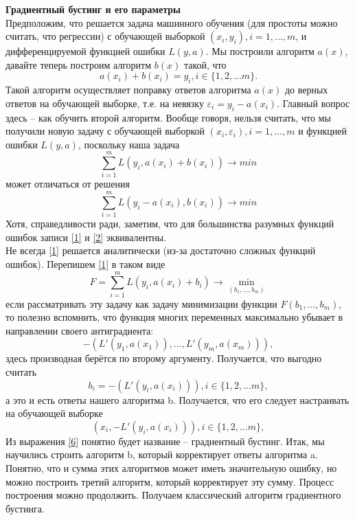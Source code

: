 \textbf{Градиентный бустинг и его параметры} \\
Предположим, что решается задача машинного обучения (для простоты можно считать, что регрессии) с обучающей выборкой $(x_i, y_i), i=1,...,m$, и дифференцируемой функцией ошибки $L(y, a)$. Мы построили алгоритм $a(x)$, давайте теперь построим алгоритм $b(x)$ такой, что
\begin{equation}\label{sum a and b}
    a(x_i)+b(x_i)=y_i, i \in \{1,2,...m\}.
\end{equation}
Такой алгоритм осуществляет поправку ответов алгоритма $a(x)$ до верных ответов на обучающей выборке, т.е. на невязку $\varepsilon_i = y_i - a(x_i)$. 
Главный вопрос здесь – как обучить второй алгоритм. Вообще говоря, нельзя считать, что мы получили новую задачу с обучающей выборкой $(x_i, \varepsilon_i), i=1,...,m$ и функцией ошибки $L(y, a)$, поскольку наша задача 
\begin{equation}\label{1}
    \displaystyle\sum_{i=1}^{m} L(y_i, a(x_i) + b(x_i)) \xrightarrow{} min
\end{equation}
может отличаться от решения
\begin{equation}\label{2}
    \displaystyle\sum_{i=1}^{m} L(y_i - a(x_i), b(x_i)) \xrightarrow{} min
\end{equation}
Хотя, справедливости ради, заметим, что для большинства разумных функций ошибок записи \ref{1} и \ref{2} эквивалентны. \\
Не всегда \ref{1} решается аналитически (из-за достаточно сложных функций ошибок). Перепишем \ref{1} в таком виде 
\begin{equation}\label{3}
    F = \displaystyle\sum_{i=1}^{m} L(y_i, a(x_i) + b_i) \xrightarrow{} \min_{(b_1, ..., b_m)}
\end{equation}
если рассматривать эту задачу как задачу минимизации функции $F(b_1, ..., b_m)$, то полезно вспомнить, что функция многих переменных максимально убывает в направлении своего антиградиента: 
\begin{equation}\label{4}
    -(L'(y_1, a(x_1)),..., L'(y_m, a(x_m))),
\end{equation}
здесь производная берётся по второму аргументу. Получается, что выгодно считать
\begin{equation}\label{5}
    b_i = -(L'(y_i, a(x_i))), i \in \{1,2,...m\},
\end{equation}
а это и есть ответы нашего алгоритма b. Получается, что его следует настраивать на обучающей выборке 
\begin{equation}\label{6}
   (x_i, -L'(y_i, a(x_i))), i \in \{1,2,...m\},
\end{equation}
Из выражения \ref{6} понятно будет название – градиентный бустинг. 
Итак, мы научились строить алгоритм b, который корректирует ответы алгоритма a. Понятно, что и сумма этих алгоритмов может иметь значительную ошибку, но можно построить третий алгоритм, который корректирует эту сумму. Процесс построения можно продолжить. Получаем классический алгоритм градиентного бустинга. \\


